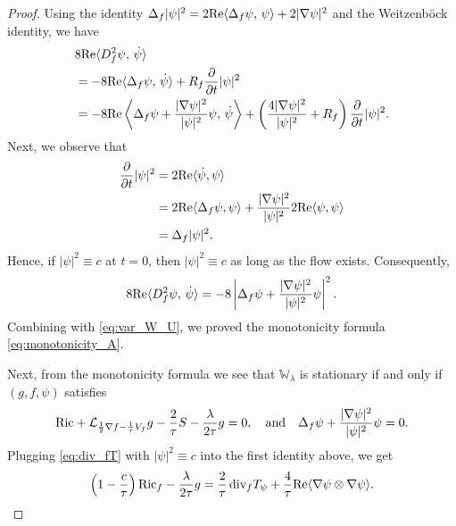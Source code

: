 \documentclass{amsart}
\newtheorem{corollary}[theorem]{Corollary}
\theoremstyle{definition}
\theoremstyle{remark}
\numberwithin{equation}{section}
\newcommand{\abs}[1]{\left|#1\right|}
\newcommand{\Ric}{\textup{Ric}}
\renewcommand{\div}{\,\textup{div}}
\begin{document}
\begin{proof}
	Using the identity $\Delta_f|\psi|^2 = 2\textup{Re}\langle\Delta_f\psi,\, \psi\rangle + 2|\nabla\psi|^2$ and the Weitzenb\"ock identity, we have
\begin{align}
\label{eq:var_D}
& 8\textup{Re}\langle D_f^2\psi,\, \dot{\psi}\rangle \\
&= -8 \textup{Re}\langle \Delta_f\psi,\, \dot{\psi}\rangle + R_f  \frac{\partial}{\partial t}|\psi|^2  \nonumber	\\
&=  -8 \textup{Re}\left\langle \Delta_f\psi + \frac{|\nabla\psi|^2}{|\psi|^2}\psi ,\, \dot{\psi}\right\rangle + \left(\frac{4|\nabla\psi|^2}{|\psi|^2}  + R_f \right)\frac{\partial}{\partial t}|\psi|^2.	\nonumber
\end{align}
Next, we observe that
\begin{align*}
	\frac{\partial}{\partial t}|\psi|^2 &= 2\textup{Re}\langle \dot\psi, \psi\rangle\\
	&= 2\textup{Re}\langle \Delta_f\psi, \psi\rangle + \frac{|\nabla\psi|^2}{|\psi|^2}2\textup{Re}\langle \psi, \psi\rangle\\
	&= \Delta_f|\psi|^2.
\end{align*}
Hence, if $\abs{\psi}^2 \equiv c$ at $t = 0$, then $|\psi|^2 \equiv c$ as long as the flow exists. Consequently,
\begin{equation}
\label{eq:Df^2=||^2}
8\textup{Re}\langle D_f^2\psi,\, \dot{\psi}\rangle = -8 \abs{ \Delta_f\psi + \frac{|\nabla\psi|^2}{|\psi|^2}\psi}^2.
\end{equation}
Combining with \eqref{eq:var_W_U}, we proved the monotonicity formula \eqref{eq:monotonicity_A}.

Next, from the monotonicity formula we see that $\mathbb{W}_\lambda$ is stationary if and only if $(g,f,\psi)$ satisfies
	\[	\Ric + \mathcal{L}_{\frac{1}{2}\nabla f  - \frac{1}{\tau}V_f}g - \frac{2}{\tau}S   - \frac{\lambda}{2\tau}g = 0,\quad\text{and}\quad \Delta_f\psi + \frac{|\nabla\psi|^2}{|\psi|^2}\psi = 0.\]
Plugging \eqref{eq:div_fT} with $|\psi|^2\equiv c$ into the first identity above, we get 
\[\left(1-\frac{c}{\tau}\right)\Ric_f - \frac{\lambda}{2\tau}g= \frac{2}{\tau}\div_f T_\psi + \frac{4}{\tau} \textup{Re}\langle\nabla\psi\otimes\nabla\psi\rangle.\]
\end{proof}

\medskip

\end{document}
